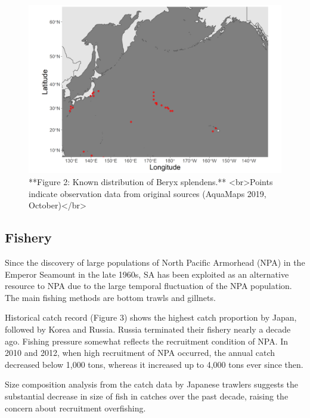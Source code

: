 \documentclass[
]{article}
\begin{document}
\begin{figure}

{\centering \includegraphics[width=0.8\linewidth,height=0.8\textheight]{Figures/SA_DistributionMap} 

}

\caption{**Figure 2: Known distribution of Beryx splendens.** <br>Points indicate observation data from original sources (AquaMaps 2019, October)</br>}\label{fig:picture2}
\end{figure}

\hypertarget{fishery}{%
\subsection{Fishery}\label{fishery}}

Since the discovery of large populations of North Pacific Armorhead
(NPA) in the Emperor Seamount in the late 1960s, SA has been exploited
as an alternative resource to NPA due to the large temporal fluctuation
of the NPA population. The main fishing methods are bottom trawls and
gillnets.

Historical catch record (Figure 3) shows the highest catch proportion by
Japan, followed by Korea and Russia. Russia terminated their fishery
nearly a decade ago. Fishing pressure somewhat reflects the recruitment
condition of NPA. In 2010 and 2012, when high recruitment of NPA
occurred, the annual catch decreased below 1,000 tons, whereas it
increased up to 4,000 tons ever since then.

Size composition analysis from the catch data by Japanese trawlers
suggests the substantial decrease in size of fish in catches over the
past decade, raising the concern about recruitment overfishing.
\end{document}
